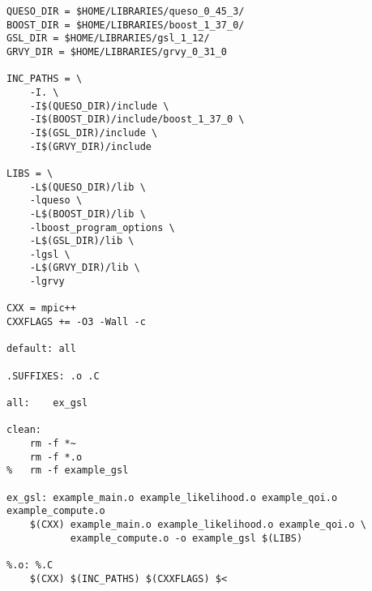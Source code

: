 \begin{lstlisting}[label={},caption={},deletekeywords={export,rm}]
QUESO_DIR = $HOME/LIBRARIES/queso_0_45_3/
BOOST_DIR = $HOME/LIBRARIES/boost_1_37_0/
GSL_DIR = $HOME/LIBRARIES/gsl_1_12/
GRVY_DIR = $HOME/LIBRARIES/grvy_0_31_0

INC_PATHS = \
	-I. \
	-I$(QUESO_DIR)/include \
	-I$(BOOST_DIR)/include/boost_1_37_0 \
	-I$(GSL_DIR)/include \
	-I$(GRVY_DIR)/include 

LIBS = \
	-L$(QUESO_DIR)/lib \
	-lqueso \
	-L$(BOOST_DIR)/lib \
	-lboost_program_options \
	-L$(GSL_DIR)/lib \
	-lgsl \
	-L$(GRVY_DIR)/lib \
	-lgrvy 

CXX = mpic++
CXXFLAGS += -O3 -Wall -c

default: all

.SUFFIXES: .o .C

all:	ex_gsl

clean:
	rm -f *~
	rm -f *.o
% 	rm -f example_gsl

ex_gsl: example_main.o example_likelihood.o example_qoi.o example_compute.o
	$(CXX) example_main.o example_likelihood.o example_qoi.o \
	       example_compute.o -o example_gsl $(LIBS)

%.o: %.C
	$(CXX) $(INC_PATHS) $(CXXFLAGS) $<
\end{lstlisting}
% 
